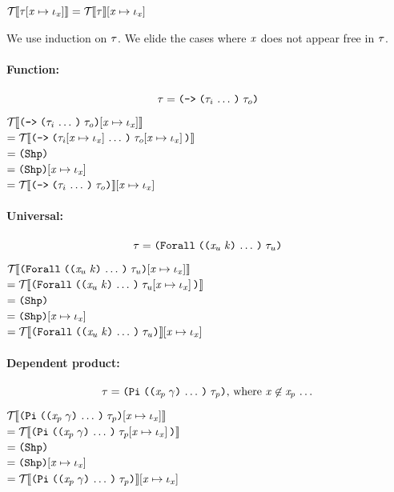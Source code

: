 \begin{lemma}%
  \label{ITSubstErase}
  $\mathcal{T}{\hskip-.25em}\left\llbracket \mathit{\tau}\hspace{-2pt}\left[ \mathit{x} \mapsto \mathit{\iota}_{\mathit{x}} \right] \right\rrbracket = \mathcal{T}{\hskip-.25em}\left\llbracket \mathit{\tau} \right\rrbracket\hspace{-2pt}\left[ \mathit{x} \mapsto \mathit{\iota}_{\mathit{x}} \right]$
\end{lemma}
\begin{sproof}
  We use induction on $\mathit{\tau}$.
  We elide the cases where $\mathit{x}$ does not appear free in $\mathit{\tau}$.
  \paragraph{Function:}
  \[\type = \typefun{\sequence{\type_i}}{\type_o}\]
  $\EraseT{\idxsubst{\typefun{\sequence{\type_i}}{\type_o}}}$ \\
  $= \EraseT{\typefun{\sequence{\idxsubst{\type_i}}}{\idxsubst{\type_o}}}$ \\
  $= \idxshape{}$ \\
  $= \idxsubst{\idxshape{}}$ \\
  $= \idxsubst{\EraseT{\typefun{\sequence{\type_i}}{\type_o}}}$ \\

  \paragraph{Universal:}
  \[\type = \typeuniv{\sequence{\notevar{\var_u}{\kind}}}{\type_u}\]
  $\EraseT{\idxsubst{\typeuniv{\sequence{\notevar{\var_u}{\kind}}}{\type_u}}}$ \\
  $= \EraseT{\typeuniv{\sequence{\notevar{\var_u}{\kind}}}{\idxsubst{\type_u}}}$ \\
  $= \idxshape{}$ \\
  $= \idxsubst{\idxshape{}}$ \\
  $= \idxsubst{\EraseT{\typeuniv{\sequence{\notevar{\var_u}{\kind}}}{\type_u}}}$ \\

  \paragraph{Dependent product:}
  \[\type = \typedprod{\sequence{\notevar{\var_p}{\sort}}}{\type_p}\text{, where }\var \not\in \sequence{\var_p}\]
  $\EraseT{\idxsubst{\typedprod{\sequence{\notevar{\var_p}{\sort}}}{\type_p}}}$ \\
  $= \EraseT{\typedprod{\sequence{\notevar{\var_p}{\sort}}}{\idxsubst{\type_p}}}$ \\
  $= \idxshape{}$ \\
  $= \idxsubst{\idxshape{}}$ \\
  $= \idxsubst{\EraseT{\typedprod{\sequence{\notevar{\var_p}{\sort}}}{\type_p}}}$ \\


\end{sproof}
